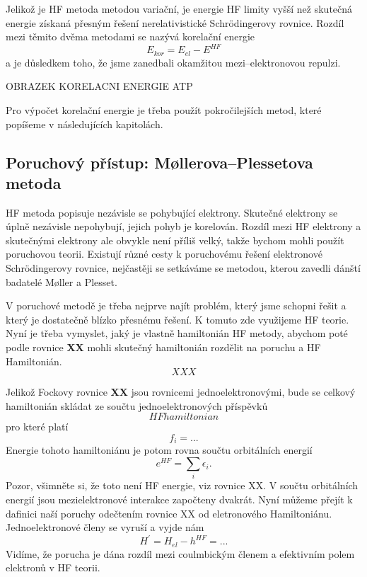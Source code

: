 Jelikož je HF metoda metodou variační, je energie HF limity vyšší než skutečná energie získaná přesným řešení nerelativistické Schr\"{o}dingerovy rovnice.
Rozdíl mezi těmito dvěma metodami se nazývá korelační energie
\begin{equation}
E_{kor}=E_{el} - E^{HF}
\end{equation}
a je důsledkem toho, že jsme zanedbali okamžitou mezi--elektronovou repulzi.

OBRAZEK KORELACNI ENERGIE ATP


Pro výpočet korelační energie je třeba použít pokročilejších metod, které popíšeme v následujících kapitolách.

\subsection{Poruchový přístup: M\o llerova--Plessetova metoda}
HF metoda popisuje nezávisle se pohybující elektrony. Skutečné elektrony se úplně nezávisle nepohybují, jejich pohyb je korelován. Rozdíl mezi HF elektrony a skutečnými elektrony ale obvykle není příliš velký, takže bychom mohli použít poruchovou teorii.  Existují různé cesty k poruchovému řešení elektronové Schr\"{o}dingerovy rovnice, nejčastěji se setkáváme se metodou, kterou zavedli dánští badatelé M\o ller a Plesset.

V poruchové metodě je třeba nejprve najít problém, který jsme schopni řešit a který je dostatečně blízko přesnému řešení. K tomuto zde využijeme HF teorie. Nyní je třeba vymyslet, jaký je vlastně hamiltonián HF metody, abychom poté podle rovnice \textbf{XX} mohli skutečný hamiltonián rozdělit na poruchu a HF Hamiltonián.
\begin{equation}
XXX
\end{equation}

Jelikož Fockovy rovnice \textbf{XX} jsou rovnicemi jednoelektronovými, bude se celkový hamiltonián skládat ze součtu jednoelektronových příspěvků
\begin{equation}
HF hamiltonian
\end{equation}
pro které platí
\begin{equation}
f_i= ...
\end{equation}
Energie tohoto hamiltoniánu je potom rovna součtu orbitálních energií
\begin{equation}
e^{HF}=\sum_i \epsilon_i .
\end{equation}
Pozor, všimněte si, že toto není HF energie, viz rovnice XX. V součtu orbitálních energií jsou mezielektronové interakce započteny dvakrát. Nyní můžeme přejít k dafinici naší poruchy odečtením rovnice XX od eletronového Hamiltoniánu. Jednoelektronové členy se vyruší a vyjde nám
\begin{equation}
H^{\prime}=H_{el}-h^{HF}= ...
\end{equation}
Vidíme, že porucha je dána rozdíl mezi coulmbickým členem a efektivním polem elektronů v HF teorii.

